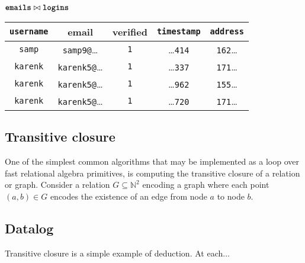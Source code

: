 \begin{center}
  $\textbf{\texttt{emails}} \bowtie \textbf{\texttt{logins}}$ \vspace{0.05cm} \\
  \begin{tabular}{ | c | c | c | c | c | }
    \hline
    \textbf{\texttt{username}} & \textbf{email} & \textbf{verified} & \textbf{\texttt{timestamp}} & \textbf{\texttt{address}} \\
    \hline
    \texttt{samp} & \texttt{samp9@}\ldots & \texttt{1} & \ldots\texttt{414} & \texttt{162}\ldots \\ \hline
    \texttt{karenk} & \texttt{karenk5@}\ldots & \texttt{1} & \ldots\texttt{337} & \texttt{171}\ldots \\ \hline
    \texttt{karenk} & \texttt{karenk5@}\ldots & \texttt{1} & \ldots\texttt{962} & \texttt{155}\ldots \\ \hline
    \texttt{karenk} & \texttt{karenk5@}\ldots & \texttt{1} & \ldots\texttt{720} & \texttt{171}\ldots \\ \hline
  \end{tabular}
\end{center}


\subsection{Transitive closure}
\label{sec:ra:tc}
%
One of the simplest common algorithms that may be implemented as a loop over fast relational algebra primitives, is computing the transitive closure of a relation or graph. Consider a relation $G \subseteq \mathbb{N}^2$ encoding a graph where each point $(a,b) \in G$ encodes the existence of an edge from node $a$ to node $b$.


\subsection{Datalog}
\label{sec:ra:tc}
%
Transitive closure is a simple example of deduction. At each...

